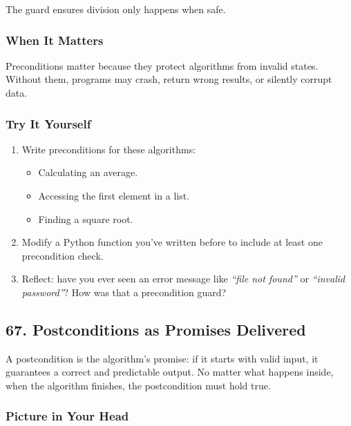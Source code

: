 \documentclass[
  letterpaper,
  DIV=11,
  numbers=noendperiod]{scrreprt}
\providecommand{\tightlist}{%
  \setlength{\itemsep}{0pt}\setlength{\parskip}{0pt}}
\begin{document}
The guard ensures division only happens when safe.

\subsubsection{When It Matters}\label{when-it-matters-63}

Preconditions matter because they protect algorithms from invalid
states. Without them, programs may crash, return wrong results, or
silently corrupt data.

\subsubsection{Try It Yourself}\label{try-it-yourself-65}

\begin{enumerate}
\def\labelenumi{\arabic{enumi}.}
\item
  Write preconditions for these algorithms:

  \begin{itemize}
  \tightlist
  \item
    Calculating an average.
  \item
    Accessing the first element in a list.
  \item
    Finding a square root.
  \end{itemize}
\item
  Modify a Python function you've written before to include at least one
  precondition check.
\item
  Reflect: have you ever seen an error message like \emph{``file not
  found''} or \emph{``invalid password''}? How was that a precondition
  guard?
\end{enumerate}

\subsection{67. Postconditions as Promises
Delivered}\label{postconditions-as-promises-delivered}

A postcondition is the algorithm's promise: if it starts with valid
input, it guarantees a correct and predictable output. No matter what
happens inside, when the algorithm finishes, the postcondition must hold
true.

\subsubsection{Picture in Your Head}\label{picture-in-your-head-66}
\end{document}
